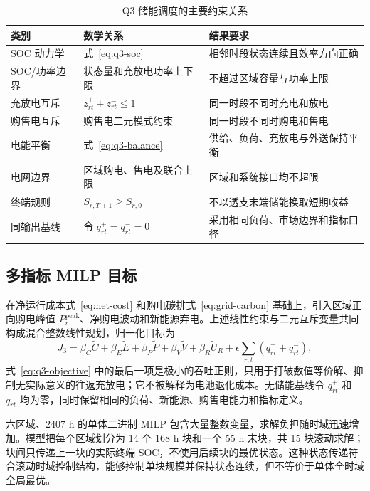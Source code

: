 \begin{table}[H]
  \centering
  \caption{Q3 储能调度的主要约束关系}
  \label{tab:q3-audit-classes}
  \small
  \begin{tabularx}{\textwidth}{p{}p{}X}
    \toprule
    类别 & 数学关系 & 结果要求 \\
    \midrule
    SOC 动力学 & 式~\eqref{eq:q3-soc} & 相邻时段状态连续且效率方向正确 \\
    SOC/功率边界 & 状态量和充放电功率上下限 & 不超过区域容量与功率上限 \\
    充放电互斥 & $z^+_{rt}+z^-_{rt}\le1$ & 同一时段不同时充电和放电 \\
    购售电互斥 & 购售电二元模式约束 & 同一时段不同时购电和售电 \\
    电能平衡 & 式~\eqref{eq:q3-balance} & 供给、负荷、充放电与外送保持平衡 \\
    电网边界 & 区域购电、售电及联合上限 & 区域和系统接口均不超限 \\
    终端规则 & $S_{r,T+1}\ge S_{r,0}$ & 不以透支末端储能换取短期收益 \\
    同输出基线 & 令 $q^+_{rt}=q^-_{rt}=0$ & 采用相同负荷、市场边界和指标口径 \\
    \bottomrule
  \end{tabularx}
\end{table}

\subsection{多指标 MILP 目标}

在净运行成本式~\eqref{eq:net-cost} 和购电碳排式~\eqref{eq:grid-carbon} 基础上，引入区域正向购电峰值 $P_r^{\mathrm{peak}}$、净购电波动和新能源弃电。上述线性约束与二元互斥变量共同构成混合整数线性规划，归一化目标为
\begin{equation}
  J_3=\beta_C\widetilde C+\beta_E\widetilde E+\beta_P\widetilde P
  +\beta_V\widetilde V+\beta_R\widetilde U_R+\epsilon\sum_{r,t}(q^+_{rt}+q^-_{rt}),
  \label{eq:q3-objective}
\end{equation}
式~\eqref{eq:q3-objective} 中的最后一项是极小的吞吐正则，只用于打破数值等价解、抑制无实际意义的往返充放电；它不被解释为电池退化成本。无储能基线令 $q^+_{rt}$ 和 $q^-_{rt}$ 均为零，同时保留相同的负荷、新能源、购售电能力和指标定义。

六区域、2407 h 的单体二进制 MILP 包含大量整数变量，求解负担随时域迅速增加。模型把每个区域划分为 14 个 168 h 块和一个 55 h 末块，共 15 块滚动求解；块间只传递上一块的实际终端 SOC，不使用后续块的最优状态。这种状态传递符合滚动时域控制结构，能够控制单块规模并保持状态连续，但不等价于单体全时域全局最优。

